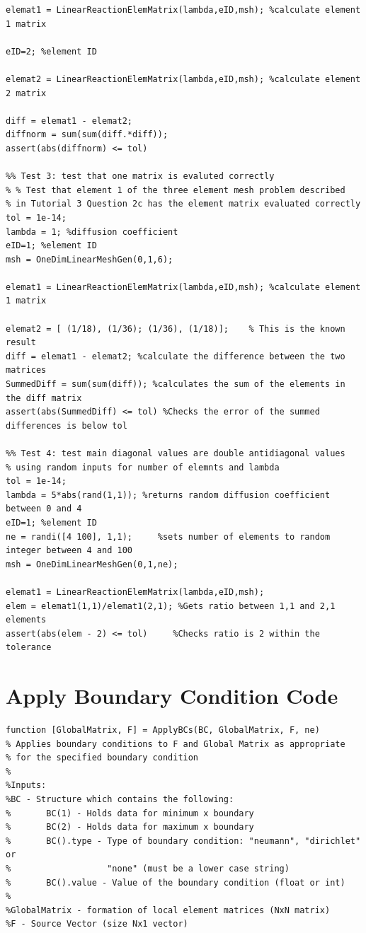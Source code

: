 \documentclass[11pt]{article}
\begin{document}
\begin{appendices}
\begin{lstlisting}
elemat1 = LinearReactionElemMatrix(lambda,eID,msh);	%calculate element 1 matrix

eID=2; %element ID

elemat2 = LinearReactionElemMatrix(lambda,eID,msh); %calculate element 2 matrix

diff = elemat1 - elemat2;
diffnorm = sum(sum(diff.*diff));
assert(abs(diffnorm) <= tol)

%% Test 3: test that one matrix is evaluted correctly
% % Test that element 1 of the three element mesh problem described 
% in Tutorial 3 Question 2c has the element matrix evaluated correctly
tol = 1e-14;
lambda = 1; %diffusion coefficient
eID=1; %element ID
msh = OneDimLinearMeshGen(0,1,6);

elemat1 = LinearReactionElemMatrix(lambda,eID,msh); %calculate element 1 matrix

elemat2 = [ (1/18), (1/36); (1/36), (1/18)];    % This is the known result
diff = elemat1 - elemat2; %calculate the difference between the two matrices
SummedDiff = sum(sum(diff)); %calculates the sum of the elements in the diff matrix
assert(abs(SummedDiff) <= tol) %Checks the error of the summed differences is below tol

%% Test 4: test main diagonal values are double antidiagonal values
% using random inputs for number of elemnts and lambda
tol = 1e-14;
lambda = 5*abs(rand(1,1)); %returns random diffusion coefficient between 0 and 4
eID=1; %element ID
ne = randi([4 100], 1,1);     %sets number of elements to random integer between 4 and 100
msh = OneDimLinearMeshGen(0,1,ne);

elemat1 = LinearReactionElemMatrix(lambda,eID,msh);
elem = elemat1(1,1)/elemat1(2,1); %Gets ratio between 1,1 and 2,1 elements
assert(abs(elem - 2) <= tol)     %Checks ratio is 2 within the tolerance

\end{lstlisting}
\pagebreak



\section{Apply Boundary Condition Code} \label{ap:BC}
\begin{lstlisting}
function [GlobalMatrix, F] = ApplyBCs(BC, GlobalMatrix, F, ne)
% Applies boundary conditions to F and Global Matrix as appropriate
% for the specified boundary condition
%
%Inputs:
%BC - Structure which contains the following:
%       BC(1) - Holds data for minimum x boundary
%       BC(2) - Holds data for maximum x boundary
%       BC().type - Type of boundary condition: "neumann", "dirichlet" or
%                   "none" (must be a lower case string)
%       BC().value - Value of the boundary condition (float or int)
%
%GlobalMatrix - formation of local element matrices (NxN matrix)
%F - Source Vector (size Nx1 vector)


\end{lstlisting}
\end{appendices}
\end{document}

